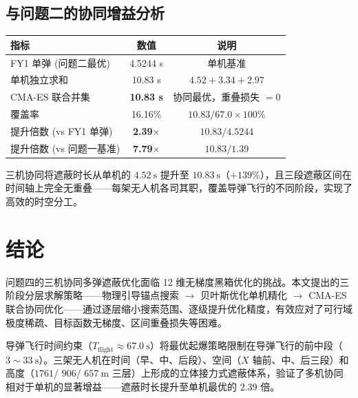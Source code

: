 \documentclass[12pt,a4paper]{ctexart}
\begin{document}
\subsection{与问题二的协同增益分析}

\begin{center}
\begin{tabular}{lcc}
\toprule
\textbf{指标} & \textbf{数值} & \textbf{说明} \\
\midrule
FY1 单弹 (问题二最优)     & 4.5244 s  & 单机基准 \\
单机独立求和              & 10.83 s  & $4.52 + 3.34 + 2.97$ \\
CMA-ES 联合并集           & \textbf{10.83 s} & 协同最优，重叠损失 $= 0$ \\
覆盖率                    & 16.16\%   & $10.83 / 67.0 \times 100\%$ \\
提升倍数 (vs FY1 单弹)    & \textbf{2.39}$\times$ & $10.83 / 4.5244$ \\
提升倍数 (vs 问题一基准)  & \textbf{7.79}$\times$ & $10.83 / 1.39$ \\
\bottomrule
\end{tabular}
\end{center}

三机协同将遮蔽时长从单机的 $4.52\ \mathrm{s}$ 提升至 $10.83\ \mathrm{s}$（$+139\%$），且三段遮蔽区间在时间轴上完全无重叠——每架无人机各司其职，覆盖导弹飞行的不同阶段，实现了高效的时空分工。

\section{结论}

问题四的三机协同多弹遮蔽优化面临 12 维无梯度黑箱优化的挑战。本文提出的三阶段分层求解策略——物理引导锚点搜索 $\to$ 贝叶斯优化单机精化 $\to$ CMA-ES 联合协同优化——通过逐层缩小搜索范围、逐级提升优化精度，有效应对了可行域极度稀疏、目标函数无梯度、区间重叠损失等困难。

导弹飞行时间约束（$T_{\text{flight}} \approx 67.0\ \mathrm{s}$）将最优起爆策略限制在导弹飞行的前中段（$3 \sim 33\ \mathrm{s}$）。三架无人机在时间（早、中、后段）、空间（$X$ 轴前、中、后三段）和高度（$1761$/ $906$/ $657\ \mathrm{m}$ 三层）上形成的立体接力式遮蔽体系，验证了多机协同相对于单机的显著增益——遮蔽时长提升至单机最优的 $2.39$ 倍。
\end{document}
